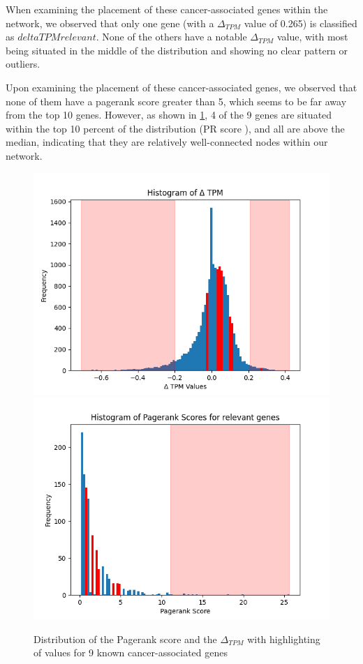When examining the placement of these cancer-associated genes within the network,
we observed that only one gene (with a $\Delta_{TPM}$ value of 0.265) is classified as $delta TPM relevant$.
None of the others have a notable $\Delta_{TPM}$ value,
with most being situated in the middle of the distribution and showing no clear pattern or outliers.

Upon examining the placement of these cancer-associated genes, we observed that none of them have a pagerank score greater than 5,
which seems to be far away from the top 10 genes.
However, as shown in \cref{fig:05_known_genes},
4 of the 9 genes are situated within the top 10 percent of the distribution (PR score ),
and all are above the median, indicating that they are relatively well-connected nodes within our network.

\begin{figure}[h]
        \includegraphics[width=\linewidth]{figures/05_01_delta_tpm_relevant}
    \endminipage
    \hfill
      \includegraphics[width=\linewidth]{figures/05_01_pagerank_known_genes}
    \endminipage
    \caption{Distribution of the Pagerank score and the $\Delta_{TPM}$ with highlighting of values for 9 known cancer-associated genes}
    \label{fig:05_known_genes}
\end{figure}

